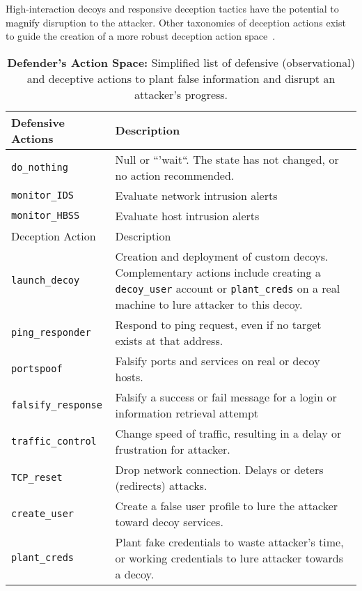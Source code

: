 \documentclass{article}
\newcommand\nnn[1]{\textcolor{black}{#1}}
\begin{document}
High-interaction decoys and responsive deception tactics have the potential to \nnn{magnify} disruption to the attacker. 
Other taxonomies of deception actions exist to guide the creation of a more robust deception action space~\cite{soule2016}\cite{park2019}.

\bgroup
\def\arraystretch{1.5}
\begin{table}[!htb] \small
	\begin{tabular}{ | p{} | p{} | }
		\hline
		\cellcolor{ltgray}Defensive Actions & \cellcolor{ltgray}Description \\ \hline
		\texttt{do\_nothing} & Null or ``'wait``. The state has not changed, or no action recommended. \\ \hline
		\texttt{monitor\_IDS} & Evaluate network intrusion alerts\\ \hline
		\texttt{monitor\_HBSS} & Evaluate host intrusion alerts\\ \hline
		\cellcolor{ltgray} Deception Action & \cellcolor{ltgray}Description\\ \hline
		\texttt{launch\_decoy} & Creation and deployment of custom decoys. Complementary actions include creating a \texttt{decoy\_user} account or \texttt{plant\_creds} on a real machine to lure attacker to this decoy. \\ \hline
		\texttt{ping\_responder} & Respond to ping request, even if no target exists at that address. \\ \hline
		\texttt{portspoof} & Falsify ports and services on real or decoy hosts. \\ \hline
		\texttt{falsify\_response} & Falsify a success or fail message for a login or information retrieval attempt \\ \hline
		\texttt{traffic\_control} & Change speed of traffic, resulting in a delay or frustration for attacker. \\ \hline
		\texttt{TCP\_reset} & Drop network connection. Delays or deters (redirects) attacks. \\ \hline
		\texttt{create\_user} & Create a false user profile to lure the attacker toward decoy services. \\ \hline
		\texttt{plant\_creds} & Plant fake credentials to waste attacker's time, or working credentials to lure attacker towards a decoy. \\ \hline
	\end{tabular}
	\caption{\textbf{Defender's Action Space:} Simplified list of defensive (observational) and deceptive actions to plant false information and disrupt an attacker's progress.} 
	\label{table:defender_actions}
\end{table}
\egroup
\end{document}
